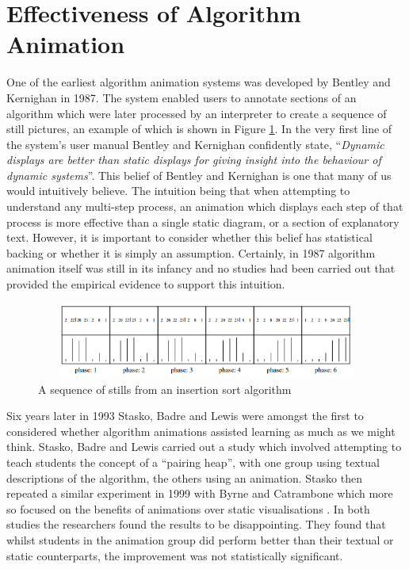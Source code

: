 \documentclass{l4proj}
\begin{document}
\section{Effectiveness of Algorithm Animation}
One of the earliest algorithm animation systems was developed by Bentley and Kernighan in 1987\cite{BentleyKernighan}. The system enabled users to annotate sections of an algorithm which were later processed by an interpreter to create a sequence of still pictures, an example of which is shown in Figure \ref{fig:bentley-kernighan}. In the very first line of the system's user manual Bentley and Kernighan confidently state, ``\textit{Dynamic displays are better than static displays for giving insight into the behaviour of dynamic systems}''. This belief of Bentley and Kernighan is one that many of us would intuitively believe. The intuition being that when attempting to understand any multi-step process, an animation which displays each step of that process is more effective than a single static diagram, or a section of explanatory text. However, it is important to consider whether this belief has statistical backing or whether it is simply an assumption. Certainly, in 1987 algorithm animation itself was still in its infancy and no studies had been carried out that provided the empirical evidence to support this intuition. 

\begin{figure}[h]
\centering
\includegraphics[height=2.5cm,width=13cm]{images/bentleykernighan.png}
\caption{A sequence of stills from an insertion sort algorithm}
\label{fig:bentley-kernighan}	
\end{figure}

Six years later in 1993 Stasko, Badre and Lewis were amongst the first to considered whether algorithm animations assisted learning as much as we might think\cite{StaskoBadreLewis}. Stasko, Badre and Lewis carried out a study which involved attempting to teach students the concept of a ``pairing heap'', with one group using textual descriptions of the algorithm, the others using an animation. Stasko then repeated a similar experiment in 1999 with Byrne and Catrambone which more so focused on the benefits of animations over static visualisations \cite{StaskoByrneCatrambone}. In both studies the researchers found the results to be disappointing. They found that whilst students in the animation group did perform better than their textual or static counterparts, the improvement was not statistically significant.
\end{document}
